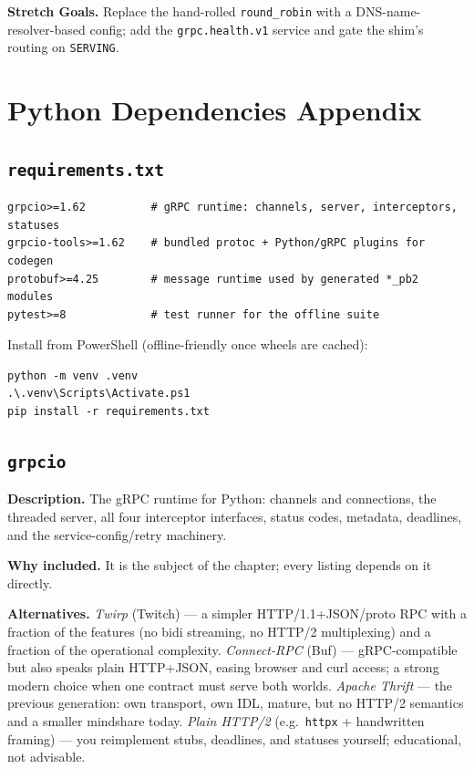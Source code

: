 \textbf{Stretch Goals.} Replace the hand-rolled \texttt{round\_robin} with a
DNS-name-resolver-based config; add the \texttt{grpc.health.v1} service and
gate the shim's routing on \texttt{SERVING}.

\section{Python Dependencies Appendix}
\label{sec:ch13-deps}

\subsection*{\texttt{requirements.txt}}

\begin{verbatim}
grpcio>=1.62          # gRPC runtime: channels, server, interceptors, statuses
grpcio-tools>=1.62    # bundled protoc + Python/gRPC plugins for codegen
protobuf>=4.25        # message runtime used by generated *_pb2 modules
pytest>=8             # test runner for the offline suite
\end{verbatim}

Install from PowerShell (offline-friendly once wheels are cached):

\begin{verbatim}
python -m venv .venv
.\.venv\Scripts\Activate.ps1
pip install -r requirements.txt
\end{verbatim}

\subsection{\texttt{grpcio}}

\textbf{Description.} The gRPC runtime for Python: channels and connections,
the threaded server, all four interceptor interfaces, status codes, metadata,
deadlines, and the service-config/retry machinery.

\textbf{Why included.} It is the subject of the chapter; every listing depends
on it directly.

\textbf{Alternatives.} \emph{Twirp} (Twitch) --- a simpler HTTP/1.1+JSON/proto
RPC with a fraction of the features (no bidi streaming, no HTTP/2 multiplexing)
and a fraction of the operational complexity. \emph{Connect-RPC} (Buf) ---
gRPC-compatible but also speaks plain HTTP+JSON, easing browser and curl access;
a strong modern choice when one contract must serve both worlds. \emph{Apache
Thrift} --- the previous generation: own transport, own IDL, mature, but no
HTTP/2 semantics and a smaller mindshare today. \emph{Plain HTTP/2} (e.g.\
\texttt{httpx} + handwritten framing) --- you reimplement stubs, deadlines, and
statuses yourself; educational, not advisable.

